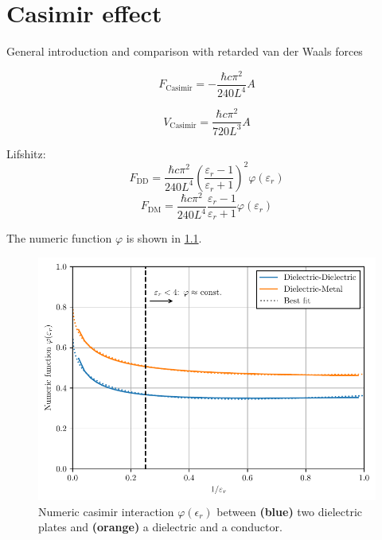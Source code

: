 \chapter{Casimir effect}\label{cha:casimir-effect}

General introduction and comparison with retarded van der Waals forces

\begin{equation}\label{eq:3:casimir-pp-F-conducting}
  F_\mathrm{Casimir} = - \frac{\hbar c \pi^2}{240 L^4} A
\end{equation}

\begin{equation}\label{eq:3:casimir-pp-E-conducting}
  V_\mathrm{Casimir} = \frac{\hbar c \pi^2}{720 L^3} A
\end{equation}


Lifshitz:
\begin{equation} \label{eq:3:casimir-pp-F-DD-lifshitz}
  F_\mathrm{DD} = \frac{\hbar c \pi^2}{240 L^4} \left( \frac{\varepsilon_r - 1}{\varepsilon_r + 1} \right)^2 \varphi(\varepsilon_r)
\end{equation}
\begin{equation}\label{eq:3:casimir-pp-F-DM-lifshitz}
  F_\mathrm{DM} = \frac{\hbar c \pi^2}{240 L^4} \frac{\varepsilon_r - 1}{\varepsilon_r + 1} \varphi(\varepsilon_r)
\end{equation}

The numeric function $\varphi$ is shown in \cref{fig:casimir-numeric}.


\begin{figure}[!htbp]
  \centering
  \includegraphics[width=\textwidth]{./../figures/casimir-numeric.pdf}
  \caption{Numeric casimir interaction $\varphi(\epsilon_r)$ between \textbf{(blue)} two dielectric plates and \textbf{(orange)} a dielectric and a conductor.}
  \label{fig:casimir-numeric}
\end{figure}


